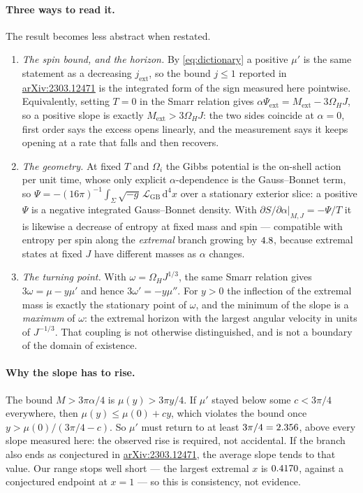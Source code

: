 \documentclass[10pt,a4paper]{article}
\newcommand{\GB}{\mathrm{GB}}
\newcommand{\ext}{\mathrm{ext}}
\newcommand{\dd}{\mathrm{d}}
\newcommand{\aX}[1]{\href{https://arxiv.org/abs/#1}{arXiv:#1}}
\begin{document}
\paragraph{Three ways to read it.}
The result becomes less abstract when restated.
\begin{enumerate}\itemsep2pt
\item \emph{The spin bound, and the horizon.} By \eqref{eq:dictionary} a
 positive $\mu'$ is the same statement as a decreasing $j_\ext$, so the bound
 $j\le1$ reported in \aX{2303.12471} is the integrated form of the sign measured
 here pointwise. Equivalently, setting $T=0$ in the Smarr relation gives
 $\alpha\Psi_\ext=M_\ext-3\Omega_HJ$, so a positive slope is exactly
 $M_\ext>3\Omega_HJ$: the two sides coincide at $\alpha=0$, first order says the
 excess opens linearly, and the measurement says it keeps opening at a rate
 that falls and then recovers.
\item \emph{The geometry.} At fixed $T$ and $\Omega_i$ the Gibbs potential is
 the on-shell action per unit time, whose only explicit $\alpha$-dependence is
 the Gauss--Bonnet term, so
 $\Psi=-(16\pi)^{-1}\int_\Sigma\sqrt{-g}\,\mathcal L_\GB\,\dd^4x$ over a
 stationary exterior slice: a positive $\Psi$ is a negative integrated
 Gauss--Bonnet density. With $\partial S/\partial\alpha|_{M,J}=-\Psi/T$ it is
 likewise a decrease of entropy at fixed mass and spin --- compatible with
 entropy per spin along the \emph{extremal} branch growing by $4.8$,
 because extremal
 states at fixed $J$ have different masses as $\alpha$ changes.
\item \emph{The turning point.} With $\omega=\Omega_HJ^{1/3}$, the same Smarr
 relation gives $3\omega=\mu-y\mu'$ and hence $3\omega'=-y\mu''$. For $y>0$ the
 inflection of the extremal mass is exactly the stationary point of $\omega$,
 and the minimum of the slope is a \emph{maximum} of $\omega$: the extremal
 horizon with the largest angular velocity in units of $J^{-1/3}$. That
 coupling is not otherwise distinguished, and is not a boundary of the domain
 of existence.
\end{enumerate}

\paragraph{Why the slope has to rise.}
The bound $M>3\pi\alpha/4$ is $\mu(y)>3\pi y/4$. If $\mu'$ stayed below some
$c<3\pi/4$ everywhere, then $\mu(y)\le\mu(0)+cy$, which violates the bound once
$y>\mu(0)/(3\pi/4-c)$. So $\mu'$ must return to at least
$3\pi/4=2.356$, above every slope measured here: the observed rise is
required, not accidental. If the branch also ends as conjectured in
\aX{2303.12471}, the average slope tends to that value. Our range stops well
short --- the largest extremal $x$ is $0.4170$, against a conjectured
endpoint at $x=1$ --- so this is consistency, not evidence.
\end{document}

